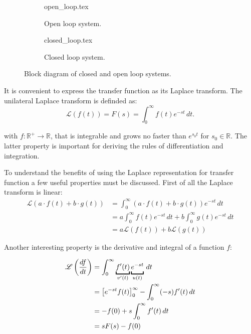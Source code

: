 \begin{figure}[ht]
    \centering
    \begin{subfigure}{0.4\linewidth}
        {open_loop.tex}
        \caption{Open loop system.}
        \label{fig:open_loop}
    \end{subfigure}
    \begin{subfigure}{0.4\linewidth}
        {closed_loop.tex}
        \caption{Closed loop system.}
        \label{fig:closed_loop}
    \end{subfigure}
    \caption{Block diagram of closed and open loop systems.}
\end{figure}

It is convenient to express the transfer function as its Laplace transform. The unilateral Laplace transform is definded as:
\begin{equation}
    \mathscr{L}\left( f(t) \right) = F(s) = \int_0^\infty f(t) e^{-st}\,dt.
\end{equation}

with $f: \mathbb{R}^+ \to \mathbb{R}$, that is integrable and grows no faster than $e^{s_0t}$ for $s_0 \in \mathbb{R}$. The latter property is important for deriving the rules of differentiation and integration.

To understand the benefits of using the Laplace representation for transfer function a few useful properties must be discussed. First of all the Laplace transform is linear:
\begin{align}
    \mathscr{L}\left(a \cdot f(t) + b \cdot g(t) \right) &= \int_0^\infty (a \cdot f(t) + b \cdot g(t)) e^{-st}\,dt \nonumber\\
    &= a \int_0^\infty f(t) e^{-st}\,dt + b \int_0^\infty g(t) e^{-st}\,dt \nonumber\\
    &= a \mathscr{L}\left(f(t)\right) + b \mathscr{L}\left(g(t)\right)
\end{align}

Another interesting property is the derivative and integral of a function $f$:

\begin{align}
    \mathscr{L}\left(\frac{df}{dt}\right) &= \int_0^\infty \underbracket{f'(t)}_{v'(t)} \underbracket{\vphantom{f'(t)}e^{-st}}_{u(t)}\,dt \nonumber\\
    &= \left[e^{-st} f(t) \right]_0^\infty - \int_0^\infty (-s)f'(t)\,dt \nonumber\\
    &= -f(0) + s \int_0^\infty f'(t)\,dt \nonumber\\
    &= s F(s) - f(0)
\end{align}

